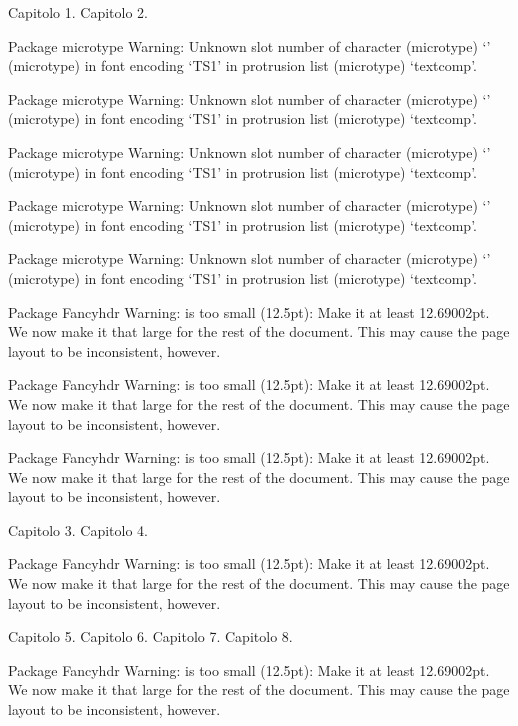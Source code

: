 Capitolo 1.
Capitolo 2.

Package microtype Warning: Unknown slot number of character
(microtype)                `\textminus '
(microtype)                in font encoding `TS1' in protrusion list
(microtype)                `textcomp'.


Package microtype Warning: Unknown slot number of character
(microtype)                `\texttrademark '
(microtype)                in font encoding `TS1' in protrusion list
(microtype)                `textcomp'.


Package microtype Warning: Unknown slot number of character
(microtype)                `\textcopyright '
(microtype)                in font encoding `TS1' in protrusion list
(microtype)                `textcomp'.


Package microtype Warning: Unknown slot number of character
(microtype)                `\textregistered '
(microtype)                in font encoding `TS1' in protrusion list
(microtype)                `textcomp'.


Package microtype Warning: Unknown slot number of character
(microtype)                `\textdegree '
(microtype)                in font encoding `TS1' in protrusion list
(microtype)                `textcomp'.


Package Fancyhdr Warning: \headheight is too small (12.5pt): 
 Make it at least 12.69002pt.
 We now make it that large for the rest of the document.
 This may cause the page layout to be inconsistent, however.


Package Fancyhdr Warning: \headheight is too small (12.5pt): 
 Make it at least 12.69002pt.
 We now make it that large for the rest of the document.
 This may cause the page layout to be inconsistent, however.


Package Fancyhdr Warning: \headheight is too small (12.5pt): 
 Make it at least 12.69002pt.
 We now make it that large for the rest of the document.
 This may cause the page layout to be inconsistent, however.

Capitolo 3.
Capitolo 4.

Package Fancyhdr Warning: \headheight is too small (12.5pt): 
 Make it at least 12.69002pt.
 We now make it that large for the rest of the document.
 This may cause the page layout to be inconsistent, however.

Capitolo 5.
Capitolo 6.
Capitolo 7.
Capitolo 8.

Package Fancyhdr Warning: \headheight is too small (12.5pt): 
 Make it at least 12.69002pt.
 We now make it that large for the rest of the document.
 This may cause the page layout to be inconsistent, however.


